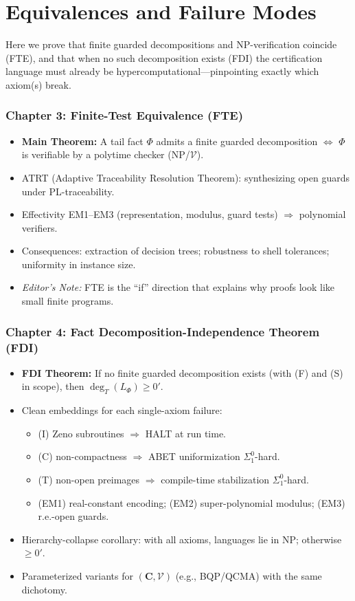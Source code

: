\documentclass[12pt]{article}
\begin{document}
\part[Equivalences and Failure Modes]{Equivalences and Failure Modes}

Here we prove that finite guarded decompositions and NP-verification coincide (FTE), and that when no such decomposition exists (FDI) the certification language must already be hypercomputational—pinpointing exactly which axiom(s) break.

\section*{Chapter 3: Finite-Test Equivalence (FTE)}
\begin{itemize}
  \item \textbf{Main Theorem:} A tail fact $\Phi$ admits a finite guarded decomposition $\iff$ $\Phi$ is verifiable by a polytime checker (NP/$\mathcal V$).
  \item ATRT (Adaptive Traceability Resolution Theorem): synthesizing open guards under PL-traceability.
  \item Effectivity EM1–EM3 (representation, modulus, guard tests) $\Rightarrow$ polynomial verifiers.
  \item Consequences: extraction of decision trees; robustness to shell tolerances; uniformity in instance size.
  \item \textit{Editor’s Note:} FTE is the “if” direction that explains why proofs look like small finite programs.
\end{itemize}

\section*{Chapter 4: Fact Decomposition-Independence Theorem (FDI)}
\begin{itemize}
  \item \textbf{FDI Theorem:} If no finite guarded decomposition exists (with (F) and (S) in scope), then $\deg_T(L_\Phi)\ge 0'$.
  \item Clean embeddings for each single-axiom failure:
    \begin{itemize}
      \item (I) Zeno subroutines $\Rightarrow$ \textsc{HALT} at run time.
      \item (C) non-compactness $\Rightarrow$ ABET uniformization $\Sigma^0_1$-hard.
      \item (T) non-open preimages $\Rightarrow$ compile-time stabilization $\Sigma^0_1$-hard.
      \item (EM1) real-constant encoding; (EM2) super-polynomial modulus; (EM3) r.e.-open guards.
    \end{itemize}
  \item Hierarchy-collapse corollary: with all axioms, languages lie in NP; otherwise $\ge 0'$.
  \item Parameterized variants for $(\mathbf C,\mathcal V)$ (e.g., BQP/QCMA) with the same dichotomy.
\end{itemize}
\end{document}
